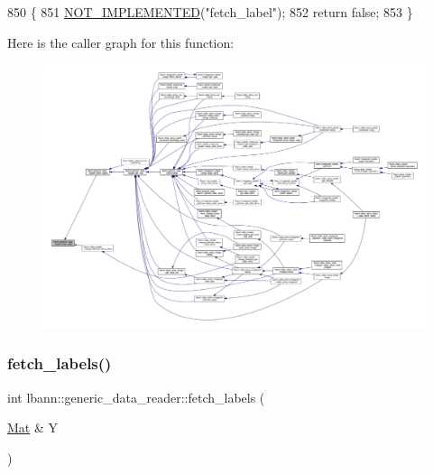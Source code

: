 \begin{DoxyCode}
850                                                                      \{
851     \hyperlink{data__reader_8hpp_a10d485225119e927ae18857acf81bdc6}{NOT\_IMPLEMENTED}(\textcolor{stringliteral}{"fetch\_label"});
852     \textcolor{keywordflow}{return} \textcolor{keyword}{false};
853   \}
\end{DoxyCode}
Here is the caller graph for this function\+:\nopagebreak
\begin{figure}[H]
\begin{center}
\leavevmode
\includegraphics[width=350pt]{classlbann_1_1generic__data__reader_a03627408c1d1aa28691d31232fe1dce5_icgraph}
\end{center}
\end{figure}
\mbox{\label{classlbann_1_1generic__data__reader_a7e624f92e38b0ee4224a6afaaf2acbdb}} 
\subsubsection{\texorpdfstring{fetch\+\_\+labels()}{fetch\_labels()}}
{\footnotesize\ttfamily int lbann\+::generic\+\_\+data\+\_\+reader\+::fetch\+\_\+labels (\begin{DoxyParamCaption}\item[{\hyperlink{base_8hpp_a68f11fdc31b62516cb310831bbe54d73}{Mat} \&}]{Y }\end{DoxyParamCaption})\hspace{0.3cm}{\ttfamily [virtual]}}



